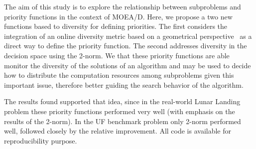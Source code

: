 The aim of this study is to explore the relationship between subproblems and priority functions in the context of MOEA/D. Here, we propose a two new functions based to diversity for defining priorities. The first considers the integration of an online diversity metric based on a geometrical perspective~\cite{gee2015online} as a direct way to define the priority function. The second addresses diversity in the decision space using the 2-norm. We that these priority functions are able monitor the diversity of the solutions of an algorithm and may be used to decide how to distribute the computation resources among subproblems given this important issue, therefore better guiding the search behavior of the algorithm.

The results found supported that idea, since in the real-world Lunar Landing problem these priority functions performed very well (with emphasis on the results of the 2-norm). In the UF benchmark problem only 2-norm performed well, followed closely by the relative improvement. All code is available for reproducibility purpose.



